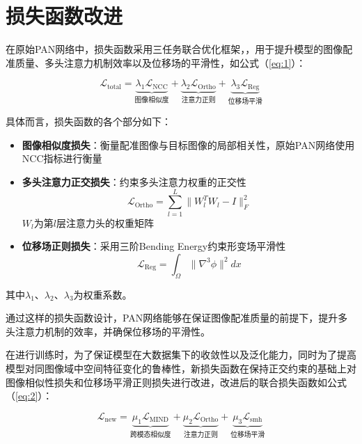 \section{损失函数改进}

在原始PAN网络中，损失函数采用三任务联合优化框架，，用于提升模型的图像配准质量、多头注意力机制效率以及位移场的平滑性，如公式（\ref{eq:1}）：

\begin{equation}
    \mathcal{L}_{\text{total}} = \underbrace{\lambda_1 \mathcal{L}_{\text{NCC}}}_{\text{图像相似度}} + \underbrace{\lambda_2 \mathcal{L}_{\text{Ortho}}}_{\text{注意力正则}} + \underbrace{\lambda_3 \mathcal{L}_{\text{Reg}}}_{\text{位移场平滑}}
    \label{eq:1}
\end{equation}

具体而言，损失函数的各个部分如下：

\begin{itemize}
    \item \textbf{图像相似度损失}：衡量配准图像与目标图像的局部相关性，原始PAN网络使用NCC指标进行衡量

    \item \textbf{多头注意力正交损失}：约束多头注意力权重的正交性
          \begin{equation}
              \mathcal{L}_{\text{Ortho}} = \sum_{l=1}^L \|W_l^T W_l - I\|_F^2
          \end{equation}
          $W_l$为第$l$层注意力头的权重矩阵

    \item \textbf{位移场正则损失}：采用三阶Bending Energy约束形变场平滑性
          \begin{equation}
              \mathcal{L}_{\text{Reg}} = \int_\Omega \|\nabla^3 \phi\|^2 dx
          \end{equation}
\end{itemize}

其中$\lambda_1$、$\lambda_2$、$\lambda_3$为权重系数。

通过这样的损失函数设计，PAN网络能够在保证图像配准质量的前提下，提升多头注意力机制的效率，并确保位移场的平滑性。


在进行训练时，为了保证模型在大数据集下的收敛性以及泛化能力，同时为了提高模型对同图像域中空间特征变化的鲁棒性，新损失函数在保持正交约束的基础上对图像相似性损失和位移场平滑正则损失进行改进，改进后的联合损失函数如公式（\ref{eq:2}）：

\begin{equation}
    \mathcal{L}_{\text{new}} = \underbrace{\mu_1 \mathcal{L}_{\text{MIND}}}_{\text{跨模态相似度}} + \underbrace{\mu_2 \mathcal{L}_{\text{Ortho}}}_{\text{注意力正则}} + \underbrace{\mu_3 \mathcal{L}_{\text{smh}}}_{\text{位移场平滑}}
    \label{eq:2}
\end{equation}


